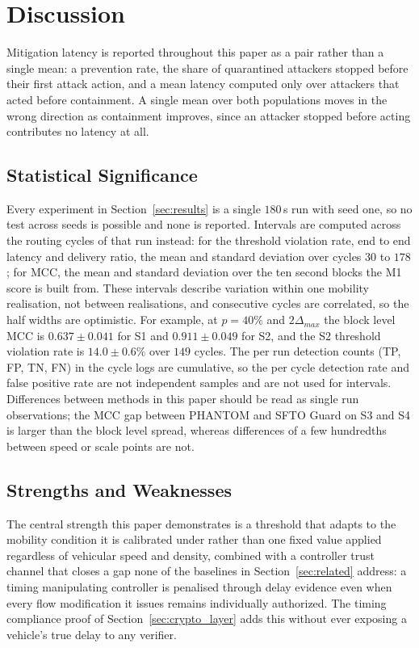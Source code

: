 \documentclass[final,5p,twocolumn]{elsarticle}
\theoremstyle{remark}
\theoremstyle{plain}
\begin{document}
\section{Discussion}
\label{sec:discussion}

Mitigation latency is reported throughout this paper as a pair rather than a
single mean: a prevention rate, the share of quarantined attackers stopped
before their first attack action, and a mean latency computed only over
attackers that acted before containment. A single mean over both
populations moves in the wrong direction as containment improves, since an
attacker stopped before acting contributes no latency at all.

\subsection{Statistical Significance}
Every experiment in Section~\ref{sec:results} is a single $180$\,s run with seed one, so no test
across seeds is possible and none is reported. Intervals are computed across the routing cycles
of that run instead: for the threshold violation rate, end to end latency and delivery ratio, the
mean and standard deviation over cycles $30$ to $178$; for MCC, the mean and standard deviation over the
ten second blocks the M1 score is built from. These intervals describe variation within one mobility
realisation, not between realisations, and consecutive cycles are correlated, so the half widths are
optimistic. For example, at $p{=}40\%$ and $2\Delta_{max}$ the block level MCC is $0.637\pm0.041$ for S1 and
$0.911\pm0.049$ for S2, and the S2 threshold violation rate is $14.0\pm0.6\%$ over $149$ cycles. The per run
detection counts (TP, FP, TN, FN) in the cycle logs are cumulative, so the per cycle detection rate and false
positive rate are not independent samples and are not used for intervals. Differences between methods in this paper
should be read as single run observations; the MCC gap between PHANTOM and SFTO Guard on S3 and S4 is
larger than the block level spread, whereas differences of a few hundredths between speed or scale points
are not.

\subsection{Strengths and Weaknesses}
The central strength this paper demonstrates is a threshold that adapts to
the mobility condition it is calibrated under rather than one fixed value
applied regardless of vehicular speed and density, combined with a
controller trust channel that closes a gap none of the baselines in
Section~\ref{sec:related} address: a timing manipulating controller is
penalised through delay evidence even when every flow modification it
issues remains individually authorized. The timing compliance proof of
Section~\ref{sec:crypto_layer} adds this without ever exposing a vehicle's
true delay to any verifier.
\end{document}
